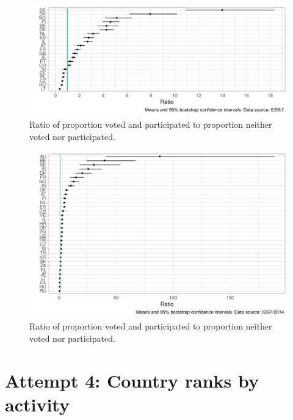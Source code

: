 \documentclass[12pt,]{article}
\begin{document}
\begin{figure}[H]

{\centering \includegraphics{report_files/figure-latex/ess-ratio-all-1} 

}

\caption{Ratio of proportion voted and participated to proportion neither voted nor participated.}\label{fig:ess-ratio-all}
\end{figure}

\begin{figure}[H]

{\centering \includegraphics{report_files/figure-latex/issp-ratio-all-1} 

}

\caption{Ratio of proportion voted and participated to proportion neither voted nor participated.}\label{fig:issp-ratio-all}
\end{figure}

\hypertarget{attempt-4-country-ranks-by-activity}{%
\section{Attempt 4: Country ranks by activity}\label{attempt-4-country-ranks-by-activity}}
\end{document}
